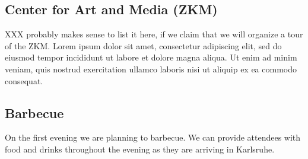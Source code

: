 \begin{multicols}{2}

\subsection{Center for Art and Media (ZKM)}

XXX probably makes sense to list it here, if we claim that we will organize
a tour of the ZKM. Lorem ipsum dolor sit amet, consectetur adipiscing elit, sed do eiusmod tempor incididunt ut labore et dolore magna aliqua. Ut enim ad minim veniam, quis nostrud exercitation ullamco laboris nisi ut aliquip ex ea commodo consequat.

\subsection{Barbecue}

On the first evening we are planning to barbecue. We can provide attendees with
food and drinks throughout the evening as they are arriving in Karlsruhe.



\end{multicols}

\newpage
